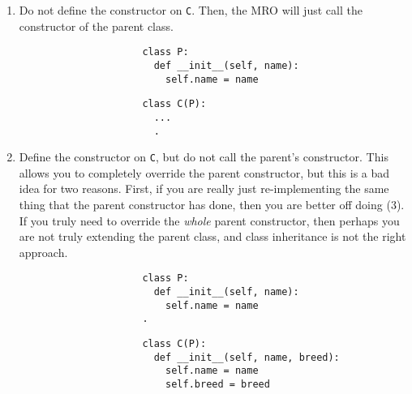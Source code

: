   \begin{enumerate}
    \item Do not define the constructor on \texttt{C}. Then, the MRO will just call the constructor of the parent class. 

    \begin{figure}[H]
      \centering
      \begin{subfigure}[b]{0.48\textwidth}
        \centering
        \begin{lstlisting}
          class P: 
            def __init__(self, name): 
              self.name = name
        \end{lstlisting}
        \caption{}
      \end{subfigure}
      \hfill 
      \begin{subfigure}[b]{0.48\textwidth}
        \centering
        \begin{lstlisting}
          class C(P): 
            ...
            .
        \end{lstlisting}
        \caption{}
      \end{subfigure}
      \caption{}
    \end{figure}

    \item Define the constructor on \texttt{C}, but do not call the parent's constructor. This allows you to completely override the parent constructor, but this is a bad idea for two reasons. First, if you are really just re-implementing the same thing that the parent constructor has done, then you are better off doing (3). If you truly need to override the \textit{whole} parent constructor, then perhaps you are not truly extending the parent class, and class inheritance is not the right approach. 

    \begin{figure}[H]
      \centering
      \begin{subfigure}[b]{0.48\textwidth}
        \centering
        \begin{lstlisting}
          class P: 
            def __init__(self, name): 
              self.name = name
          .
        \end{lstlisting}
        \caption{}
      \end{subfigure}
      \hfill 
      \begin{subfigure}[b]{0.48\textwidth}
        \centering
        \begin{lstlisting}
          class C(P): 
            def __init__(self, name, breed): 
              self.name = name 
              self.breed = breed
        \end{lstlisting}
        \caption{}
      \end{subfigure}
      \caption{}
    \end{figure}


\end{enumerate}
